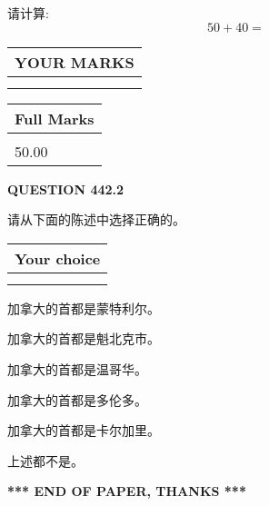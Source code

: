 \documentclass{ctexart}
\begin{document}
  
 
请计算:
\begin{equation}
50 +  %
40 = \nonumber
\end{equation}
 

 

 
  
\vspace{0.2in}
  
\noindent\begin{tabular}{|l|}
\hline
 YOUR MARKS  \\
\hline
 \\ 
 \\ 
\hline
\end{tabular}
\hspace{0.05in} \begin{tabular}{|l|}
\hline
 Full Marks  \\
\hline
 \\ 
50.00 \\
\hline
\end{tabular}
{\textbf{\Large{QUESTION
442.2 
}}}
  
  
请从下面的陈述中选择正确的。
  
  
\noindent\hspace{3.0in} \begin{tabular}{|l|}
\hline
Your choice \\
\hline
 \\ 
 \\ 
\hline
\end{tabular}
  
  
 
 
加拿大的首都是蒙特利尔。
 
 
加拿大的首都是魁北克市。
 
 
加拿大的首都是温哥华。
 
 
加拿大的首都是多伦多。
 
 
加拿大的首都是卡尔加里。
 
 
 上述都不是。
 
 
   
   
 \vspace{0.2in}
 
   
   
   
   
\vspace{1.0in} 
{\textbf{\large{ *** END OF PAPER, THANKS *** }}} 
   
\end{document}
